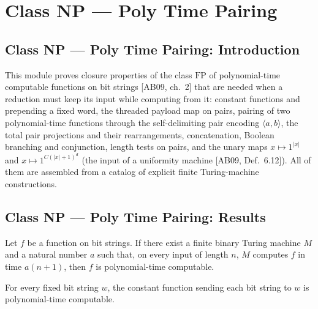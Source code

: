 \section{Class NP --- Poly Time Pairing}
\subsection*{Class NP --- Poly Time Pairing: Introduction}

This module proves closure properties of the class $\mathrm{FP}$ of polynomial-time
computable functions on bit strings [AB09, ch.~2] that are needed when a reduction must keep
its input while computing from it: constant functions and prepending a fixed word, the
threaded payload map on pairs, pairing of two polynomial-time functions through the
self-delimiting pair encoding $\langle a,b\rangle$, the total pair projections and their
rearrangements, concatenation, Boolean branching and conjunction, length tests on pairs, and
the unary maps $x \mapsto 1^{|x|}$ and $x \mapsto 1^{C(|x|+1)^d}$ (the input of a uniformity
machine [AB09, Def.~6.12]). All of them are assembled from a catalog of explicit finite
Turing-machine constructions.

\subsection*{Class NP --- Poly Time Pairing: Results}

\begin{theorem}
\label{Complexity.polyTimeComputable_of_linear}
\leanok
{}
Let $f$ be a function on bit strings. If there exist a finite binary Turing machine $M$
and a natural number $a$ such that, on every input of length $n$, $M$ computes $f$ in
time $a(n+1)$, then $f$ is polynomial-time computable.
\end{theorem}

\begin{theorem}
\label{Complexity.polyTimeComputable_const}
\leanok
{}
For every fixed bit string $w$, the constant function sending each bit string to $w$ is
polynomial-time computable.
\end{theorem}

